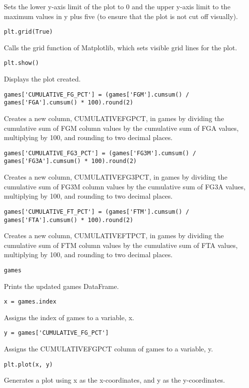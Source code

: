 \documentclass{article}
\begin{document}
Sets the lower y-axis limit of the plot to 0 and the upper y-axis limit to the maximum values in y plus five (to ensure that the plot is not cut off visually).
\begin{lstlisting}
plt.grid(True)
\end{lstlisting}
Calls the grid function of Matplotlib, which sets visible grid lines for the plot.
\begin{lstlisting}
plt.show()
\end{lstlisting}
Displays the plot created.
\begin{lstlisting}
games['CUMULATIVE_FG_PCT'] = (games['FGM'].cumsum() / games['FGA'].cumsum() * 100).round(2)
\end{lstlisting}
Creates a new column, CUMULATIVE\textunderscore FG\textunderscore PCT, in games by dividing the cumulative sum of FGM column values by the cumulative sum of FGA values, multiplying by 100, and rounding to two decimal places.
\begin{lstlisting}
games['CUMULATIVE_FG3_PCT'] = (games['FG3M'].cumsum() / games['FG3A'].cumsum() * 100).round(2)
\end{lstlisting}
Creates a new column, CUMULATIVE\textunderscore FG3\textunderscore PCT, in games by dividing the cumulative sum of FG3M column values by the cumulative sum of FG3A values, multiplying by 100, and rounding to two decimal places.
\begin{lstlisting}
games['CUMULATIVE_FT_PCT'] = (games['FTM'].cumsum() / games['FTA'].cumsum() * 100).round(2)
\end{lstlisting}
Creates a new column, CUMULATIVE\textunderscore FT\textunderscore PCT, in games by dividing the cumulative sum of FTM column values by the cumulative sum of FTA values, multiplying by 100, and rounding to two decimal places.
\begin{lstlisting}
games
\end{lstlisting}
Prints the updated games DataFrame.
\begin{lstlisting}
x = games.index
\end{lstlisting}
Assigns the index of games to a variable, x.
\begin{lstlisting}
y = games['CUMULATIVE_FG_PCT']
\end{lstlisting}
Assigns the CUMULATIVE\textunderscore FG\textunderscore PCT column of games to a variable, y.
\begin{lstlisting}
plt.plot(x, y)
\end{lstlisting}
Generates a plot using x as the x-coordinates, and y as the y-coordinates.
\end{document}
